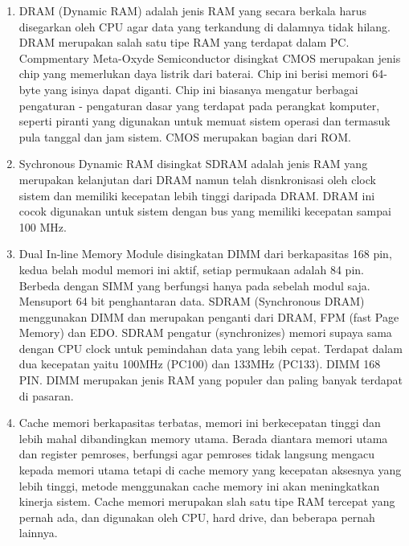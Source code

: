 \documentclass{article}
\begin{document}
\begin{enumerate}
\item DRAM (Dynamic RAM) adalah jenis RAM yang secara berkala harus disegarkan oleh CPU agar data yang terkandung di dalamnya tidak hilang. DRAM merupakan salah satu tipe RAM yang terdapat dalam PC.
Compmentary Meta-Oxyde Semiconductor disingkat CMOS merupakan jenis chip yang memerlukan daya listrik dari baterai. Chip ini berisi memori 64-byte yang isinya dapat diganti. Chip ini biasanya mengatur berbagai pengaturan - pengaturan dasar yang terdapat 
pada perangkat komputer, seperti piranti yang digunakan untuk memuat sistem operasi dan termasuk pula tanggal dan jam sistem. CMOS merupakan bagian dari ROM.

\item Sychronous Dynamic RAM disingkat SDRAM adalah jenis RAM yang merupakan kelanjutan dari DRAM namun telah disnkronisasi oleh clock sistem dan memiliki kecepatan lebih tinggi daripada DRAM. DRAM ini cocok digunakan untuk sistem dengan bus yang memiliki kecepatan sampai 100 MHz.

\item Dual In-line Memory Module disingkatan DIMM dari  berkapasitas 168 pin, kedua belah modul memori ini aktif, setiap permukaan adalah 84 pin. Berbeda dengan SIMM yang berfungsi hanya pada sebelah modul saja. Mensuport 64 bit penghantaran data. SDRAM
(Synchronous DRAM) menggunakan DIMM dan merupakan penganti dari DRAM, FPM (fast Page Memory) dan EDO. SDRAM pengatur (synchronizes) memori supaya sama dengan CPU clock untuk pemindahan data yang lebih cepat. Terdapat dalam dua kecepatan yaitu 100MHz (PC100) dan 133MHz (PC133). DIMM 168 PIN. DIMM merupakan jenis RAM yang populer dan paling banyak terdapat di pasaran.

\item Cache memori berkapasitas terbatas, memori ini berkecepatan tinggi dan lebih mahal dibandingkan memory utama. Berada diantara memori utama dan register pemroses, berfungsi agar pemroses tidak langsung mengacu kepada memori utama tetapi di cache memory yang kecepatan aksesnya yang lebih tinggi, metode menggunakan cache memory ini akan meningkatkan kinerja sistem. Cache memori merupakan slah satu tipe RAM tercepat yang pernah ada, dan digunakan oleh CPU, hard drive, dan beberapa pernah lainnya.


\end{enumerate}
\end{document}
